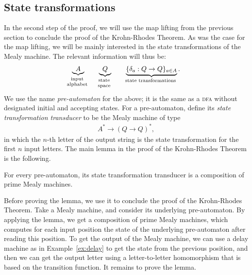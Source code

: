 \subsection{State transformations}
\label{sec:state-transformations}

In the second step of the proof, we will use the map lifting from the previous section to conclude the proof of the Krohn-Rhodes Theorem. As was the case for the map lifting, we will be mainly interested in the state transformations of the Mealy machine. The relevant information will thus be: 
\begin{align}\label{eq:pre-automaton}
\myunderbrace{A}{input \\ alphabet} \qquad 
\myunderbrace{Q}{state \\ space} \qquad 
\myunderbrace{\set{\delta_a : Q \to Q}_{a \in A}}{state transformations}.
\end{align}
We use the name \emph{pre-automaton} for the above; it is the same as a \textsc{dfa} without designated initial and accepting states. For a pre-automaton, define its \emph{state transformation transducer} to be the Mealy machine of type  
\begin{align*}
A^* \to (Q \to Q)^*,
\end{align*}
in which the  $n$-th letter of the output string is the state transformation for the first $n$ input letters. The main lemma in the proof of the Krohn-Rhodes Theorem is the following. 

\begin{lemma}\label{lem:Mealy-map-lifting}
    For every pre-automaton, its state transformation transducer  is a composition of prime Mealy machines.
\end{lemma}

Before proving the lemma, we use it to conclude the proof of the Krohn-Rhodes Theorem. Take a Mealy machine, and consider its  underlying pre-automaton.  By applying the lemma, we get a composition of prime Mealy machines, which computes for each input position the state of the underlying pre-automaton after reading this position. To get the output of the Mealy machine, we can use a delay machine as in Example~\ref{ex:delay} to get the state from the previous position, and then we can get the output letter using a letter-to-letter homomorphism that is based on the transition function. It remains to prove the lemma.

